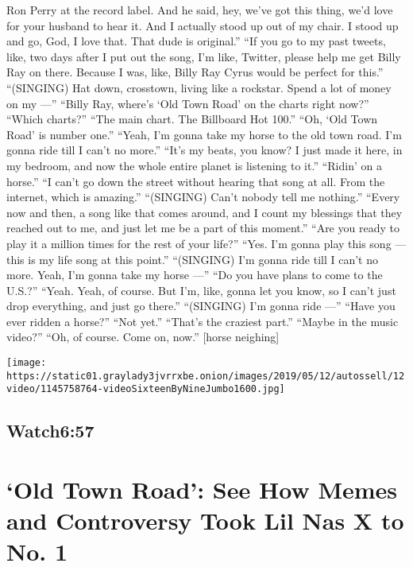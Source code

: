 \begin{itemize}
  Ron Perry at the record label. And he said, hey, we've got this thing,
  we'd love for your husband to hear it. And I actually stood up out of
  my chair. I stood up and go, God, I love that. That dude is
  original.'' ``If you go to my past tweets, like, two days after I put
  out the song, I'm like, Twitter, please help me get Billy Ray on
  there. Because I was, like, Billy Ray Cyrus would be perfect for
  this.'' ``(SINGING) Hat down, crosstown, living like a rockstar. Spend
  a lot of money on my ---'' ``Billy Ray, where's `Old Town Road' on the
  charts right now?'' ``Which charts?'' ``The main chart. The Billboard
  Hot 100.'' ``Oh, `Old Town Road' is number one.'' ``Yeah, I'm gonna
  take my horse to the old town road. I'm gonna ride till I can't no
  more.'' ``It's my beats, you know? I just made it here, in my bedroom,
  and now the whole entire planet is listening to it.'' ``Ridin' on a
  horse.'' ``I can't go down the street without hearing that song at
  all. From the internet, which is amazing.'' ``(SINGING) Can't nobody
  tell me nothing.'' ``Every now and then, a song like that comes
  around, and I count my blessings that they reached out to me, and just
  let me be a part of this moment.'' ``Are you ready to play it a
  million times for the rest of your life?'' ``Yes. I'm gonna play this
  song --- this is my life song at this point.'' ``(SINGING) I'm gonna
  ride till I can't no more. Yeah, I'm gonna take my horse ---'' ``Do
  you have plans to come to the U.S.?'' ``Yeah. Yeah, of course. But
  I'm, like, gonna let you know, so I can't just drop everything, and
  just go there.'' ``(SINGING) I'm gonna ride ---'' ``Have you ever
  ridden a horse?'' ``Not yet.'' ``That's the craziest part.'' ``Maybe
  in the music video?'' ``Oh, of course. Come on, now.'' {[}horse
  neighing{]}
\end{itemize}

\texttt{[image: https://static01.graylady3jvrrxbe.onion/images/2019/05/12/autossell/12video/1145758764-videoSixteenByNineJumbo1600.jpg]}

\hypertarget{watch657}{%
\subsection{Watch6:57}\label{watch657}}

\hypertarget{old-town-road-see-how-memes-and-controversy-took-lil-nas-x-to-no-1-1}{%
\section{`Old Town Road': See How Memes and Controversy Took Lil Nas X
to No.
1}\label{old-town-road-see-how-memes-and-controversy-took-lil-nas-x-to-no-1-1}}


